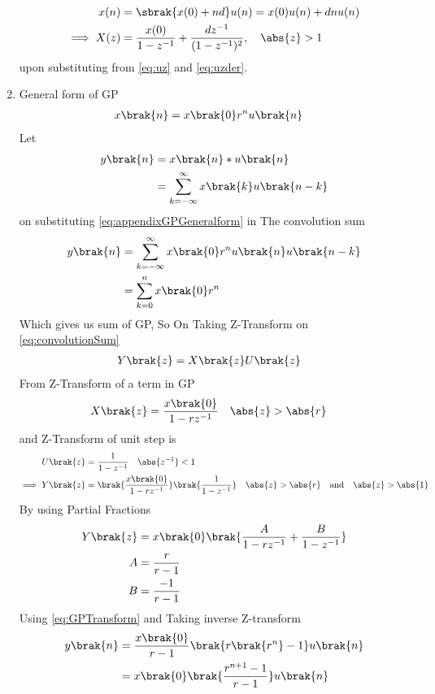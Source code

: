 \begin{enumerate}[label=\thechapter.\arabic*,ref=\thechapter.\theenumi]
\begin{align}
	x(n) &= \sbrak{x(0) + nd} u(n) = x(0)u(n) + dnu(n)  \\
	\implies X(z) &= \frac{x(0)}{1-z^{-1}} + \frac{dz^{-1}}{(1-z^{-1})^{2}}, \quad \abs{z} > 1 
	       \label{eq:apz}
\end{align}
upon substituting from 
	       \eqref{eq:uz}
	       and
	       \eqref{eq:uzder}.
\item General form of GP
\begin{align}
	x\brak{n}&=x\brak{0}r^n u\brak{n} \label{eq:appendixGPGeneralform}
\end{align}
Let 
\begin{align}
	y\brak{n} &=x\brak{n} * u\brak{n} \label{eq:convolutionSum}\\
	&=\sum _{k=-\infty}^{\infty} x\brak{k} u\brak{n-k}
\end{align}
on substituting \eqref{eq:appendixGPGeneralform} in The convolution sum 
\begin{align}
	y\brak{n} &= \sum_{k=-\infty}^{\infty} x\brak{0}r^n u\brak{n} u\brak{n-k}\\
	&= \sum _{k=0}^{n} x\brak{0} r^n
\end{align}
Which gives us sum of GP, So On Taking Z-Transform on \eqref{eq:convolutionSum}
\begin{align}
	Y\brak{z}&= X\brak{z} U\brak{z}
\end{align}
From Z-Transform of a term in GP 
\begin{align}
	X\brak{z}&=	\frac{x\brak{0}}{1-rz^{-1}}  \label{eq:GPTransform} \quad \abs{z} > \abs{r}
\end{align}
and Z-Transform of unit step is 
\begin{align}
	U\brak{z} &=\frac{1}{1-z^{-1}}  \quad \abs{z^{-1}}<1\\
	\implies Y\brak{z}&=\brak{\frac{x\brak{0}}{1-rz^{-1}}}\brak{\frac{1}{1-z^{-1}}} \quad \abs{z} > \abs{r} \quad \text{and}  \quad \abs{z}>\abs{1}
\end{align}
By using Partial Fractions
\begin{align}
	Y\brak{z}&=x\brak{0}\brak{\frac{A}{1-rz^{-1}} + \frac{B}{1-z^{-1}}}\\
	A&=\frac{r}{r-1}\\
	B&= \frac{-1}{r-1}
\end{align}
Using \eqref{eq:GPTransform} and Taking inverse Z-transform 
\begin{align}
	y\brak{n}&=\frac{x\brak{0}}{r-1}\brak{r\brak{r^n}-1}u\brak{n}\\
	&=x\brak{0}\brak{\frac{r^{n+1}-1}{r-1}}u\brak{n}
\end{align}
\end{enumerate}
